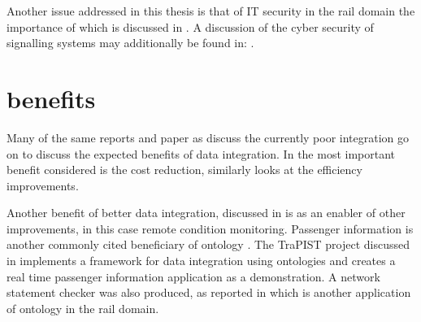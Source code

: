 Another issue addressed in this thesis is that of IT security in the rail domain the importance of which is discussed in \cite{Depar2016}. A discussion of the cyber security of signalling systems may additionally be found in: \cite{BloomField2016}.

\section{benefits}
\label{benefits}

Many of the same reports and paper as discuss the currently poor integration go on to discuss the expected benefits of data integration. In \cite{RSSB2017} the most important benefit considered is the cost reduction, similarly \cite{Verstichel2011a} looks at the efficiency improvements. 

Another benefit of better data integration, discussed in \cite{Tutcher2013} is as an enabler of other improvements, in this case remote condition monitoring. Passenger information is another commonly cited beneficiary of ontology \cite{Verstichel2014}. The TraPIST project discussed in \cite{Verstichel2014} implements a framework for data integration using ontologies and creates a real time passenger information application as a demonstration. A network statement checker was also produced, as reported in \cite{Verstichel2011a} which is another application of ontology in the rail domain.

